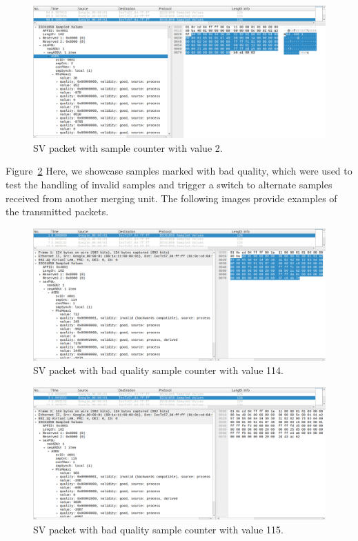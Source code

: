\begin{figure}[tbh]
	\centering
	\includegraphics[width=1.00\textwidth, keepaspectratio]{ch6/assets/sv_seq_3.png} %
	\caption{SV packet with sample counter with value 2.}
	\label{fig:sv_seq_3}
\end{figure}
\FloatBarrier

Figure~\ref{fig:sv_seq_bad_1} Here, we showcase samples marked with bad quality, which were used to test the handling of invalid samples and trigger a switch to alternate samples received from another merging unit. The following images provide examples of the transmitted packets.

\begin{figure}[tbh]
	\centering
	\includegraphics[width=1.00\textwidth, keepaspectratio]{ch6/assets/sv_seq_bad_1.png} %
	\caption{SV packet with bad quality sample counter with value 114.}
	\label{fig:sv_seq_bad_1}
\end{figure}
\FloatBarrier

\begin{figure}[tbh]
	\centering
	\includegraphics[width=1.00\textwidth, keepaspectratio]{ch6/assets/sv_seq_bad_2.png} %
	\caption{SV packet with bad quality sample counter with value 115.}
	\label{fig:sv_seq_bad_2}
\end{figure}
\FloatBarrier

